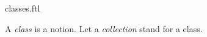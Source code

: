 \documentclass{stex}
\begin{document}
\begin{smodule}{classes.ftl}


\begin{fakeforthel}
  \begin{signature*}
    A \emph{class} is a notion.
    Let a \emph{collection} stand for a class.
  \end{signature*}
\end{fakeforthel}

\end{smodule}
\end{document}
